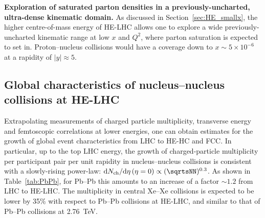 \documentclass[../report.tex]{subfiles}
\begin{document}
{\bf Exploration of saturated parton densities in a previously-uncharted, ultra-dense kinematic domain.}
As discussed in Section~\ref{sec:HE_smallx}, the higher centre-of-mass energy of HE-LHC allows one to explore a wide previously-uncharted kinematic range 
at low $x$ and $Q^2$, where parton saturation is expected to set in.  
Proton--nucleus collisions would have a coverage down  to $x\sim 5\times 10^{-6}$ at a rapidity of $|y|\approx 5$. 


\subsection{Global characteristics of nucleus--nucleus collisions at HE-LHC}
\label{sec:HE_qgpglobal}

Extrapolating measurements of charged particle multiplicity, transverse energy and femtoscopic correlations 
at lower energies, one can obtain estimates
for the growth of global event characteristics from LHC to HE-HC and FCC. In particular, up to the top LHC energy, the growth of charged-particle 
multiplicity per participant pair per unit rapidity in nucleus--nucleus collisions is consistent with a slowly-rising power-law:
   ${\rm d}N_{\rm ch}/{\rm d}\eta\,(\eta=0) \propto (\sqrtsNN)^{0.3}$.
As shown in Table~\ref{tab:PbPb}, for Pb--Pb this amounts to an increase of a factor $\sim 1.2$ from LHC to HE-LHC. 
The multiplicity in central Xe--Xe collisions is expected to be lower by 35\% with respect to Pb--Pb collisions at HE-LHC, and similar to 
that of Pb--Pb collisions at 2.76~TeV.
\end{document}

